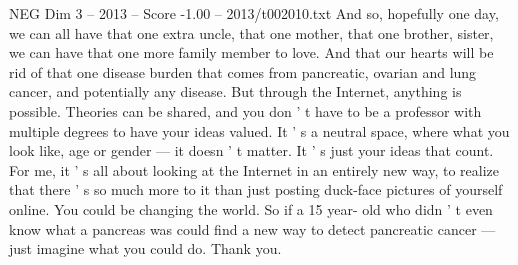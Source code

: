 \begin{textsample}{NEG Dim 3 – 2013 – Score -1.00 – 2013/t002010.txt}
And so, hopefully one day, we can all have that one extra uncle, that one mother, that one brother, sister, we can have that one more family member to love.
And that our hearts will be rid of that one disease burden that comes from pancreatic, ovarian and lung cancer, and potentially any disease.
But through the Internet, anything is possible.
Theories can be shared, and you don ' t have to be a professor with multiple degrees to have your ideas valued.
It ' s a neutral space, where what you look like, age or gender — it doesn ' t matter.
It ' s just your ideas that count.
For me, it ' s all about looking at the Internet in an entirely new way, to realize that there ' s so much more to it than just posting duck-face pictures of yourself online.
You could be changing the world.
So if a 15 year- old who didn ' t even know what a pancreas was could find a new way to detect pancreatic cancer — just imagine what you could do.
Thank you.

\end{textsample}
